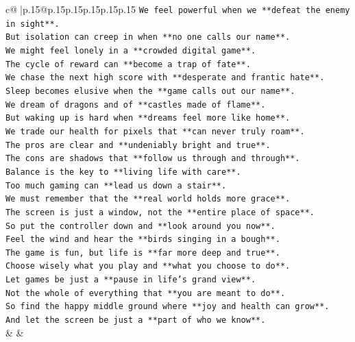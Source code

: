 \documentclass{article}
\begin{document}
{\begin{supertabular}{c@{$\;$}|p{.15\linewidth}@{}p{.15\linewidth}p{.15\linewidth}p{.15\linewidth}p{.15\linewidth}p{.15\linewidth}}
{{{\texttt{We feel powerful when we **defeat the enemy in sight**.} \\
\texttt{But isolation can creep in when **no one calls our name**.} \\
\texttt{We might feel lonely in a **crowded digital game**.} \\
\texttt{The cycle of reward can **become a trap of fate**.} \\
\texttt{We chase the next high score with **desperate and frantic hate**.} \\
\texttt{Sleep becomes elusive when the **game calls out our name**.} \\
\texttt{We dream of dragons and of **castles made of flame**.} \\
\texttt{But waking up is hard when **dreams feel more like home**.} \\
\texttt{We trade our health for pixels that **can never truly roam**.} \\
\texttt{The pros are clear and **undeniably bright and true**.} \\
\texttt{The cons are shadows that **follow us through and through**.} \\
\texttt{Balance is the key to **living life with care**.} \\
\texttt{Too much gaming can **lead us down a stair**.} \\
\texttt{We must remember that the **real world holds more grace**.} \\
\texttt{The screen is just a window, not the **entire place of space**.} \\
\texttt{So put the controller down and **look around you now**.} \\
\texttt{Feel the wind and hear the **birds singing in a bough**.} \\
\texttt{The game is fun, but life is **far more deep and true**.} \\
\texttt{Choose wisely what you play and **what you choose to do**.} \\
\texttt{Let games be just a **pause in life's grand view**.} \\
\texttt{Not the whole of everything that **you are meant to do**.} \\
\texttt{So find the happy middle ground where **joy and health can grow**.} \\
\texttt{And let the screen be just a **part of who we know**.} \\
            }
        }
    }
    & & \\ \\


\end{supertabular}}
\end{document}
